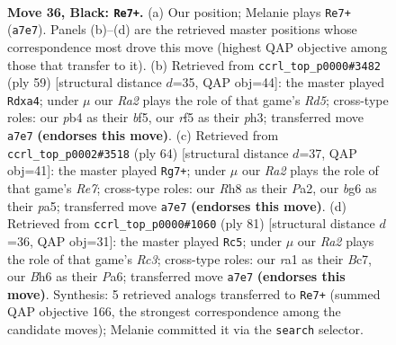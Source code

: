 \documentclass[11pt]{article}
\begin{document}
\clearpage

\begin{figure}[p]\centering
\begin{subfigure}{0.46\textwidth}\centering
\resizebox{\linewidth}{!}{%
\newchessgame
\chessboard[
  setfen={1k5r/r4P2/p5Bb/2P2R2/1P5p/8/8/R3K3 b Q - 0 36},
  showmover=false,
  pgfstyle=straightmove, color=movearrow, markmove={a7-e7}
]}
\caption{}
\end{subfigure}\hfill
\begin{subfigure}{0.46\textwidth}\centering
\resizebox{\linewidth}{!}{%
\newchessgame
\chessboard[
  setfen={r5k1/1R3pb1/7p/5B2/P2r4/7P/2P3P1/5R1K b - - 0 30},
  showmover=false,
  pgfstyle=straightmove, color=movearrow, markmove={d4-a4}
]}
\caption{}
\end{subfigure}
\\[4pt]
\begin{subfigure}{0.46\textwidth}\centering
\resizebox{\linewidth}{!}{%
\newchessgame
\chessboard[
  setfen={5rk1/2R1R2p/6pr/p7/8/8/P4P2/5K2 w - - 0 33},
  showmover=false,
  pgfstyle=straightmove, color=movearrow, markmove={e7-g7}
]}
\caption{}
\end{subfigure}\hfill
\begin{subfigure}{0.46\textwidth}\centering
\resizebox{\linewidth}{!}{%
\newchessgame
\chessboard[
  setfen={2r4k/2b4p/p1r5/5N2/8/8/P1P1R2P/1R5K b - - 6 41},
  showmover=false,
  pgfstyle=straightmove, color=movearrow, markmove={c6-c5}
]}
\caption{}
\end{subfigure}
\caption{\textbf{Move 36, Black: \texttt{Re7+}.} (a) Our position; Melanie plays \texttt{Re7+} (\texttt{a7e7}). Panels (b)--(d) are the retrieved master positions whose correspondence most drove this move (highest QAP objective among those that transfer to it). (b) Retrieved from \texttt{ccrl\_top\_p0000\#3482} (ply 59) [structural distance $d$=35, QAP obj=44]: the master played \texttt{Rdxa4}; under $\mu$ our \emph{Ra2} plays the role of that game's \emph{Rd5}; cross-type roles: our \emph{p}b4 as their \emph{b}f5, our \emph{r}f5 as their \emph{p}h3; transferred move \texttt{a7e7} \textbf{(endorses this move)}. (c) Retrieved from \texttt{ccrl\_top\_p0002\#3518} (ply 64) [structural distance $d$=37, QAP obj=41]: the master played \texttt{Rg7+}; under $\mu$ our \emph{Ra2} plays the role of that game's \emph{Re7}; cross-type roles: our \emph{R}h8 as their \emph{P}a2, our \emph{b}g6 as their \emph{p}a5; transferred move \texttt{a7e7} \textbf{(endorses this move)}. (d) Retrieved from \texttt{ccrl\_top\_p0000\#1060} (ply 81) [structural distance $d$=36, QAP obj=31]: the master played \texttt{Rc5}; under $\mu$ our \emph{Ra2} plays the role of that game's \emph{Rc3}; cross-type roles: our \emph{r}a1 as their \emph{B}c7, our \emph{B}h6 as their \emph{P}a6; transferred move \texttt{a7e7} \textbf{(endorses this move)}. Synthesis: 5 retrieved analogs transferred to \texttt{Re7+} (summed QAP objective 166, the strongest correspondence among the candidate moves); Melanie committed it via the \texttt{search} selector.}
\label{fig:thought-m71}
\end{figure}
\end{document}
